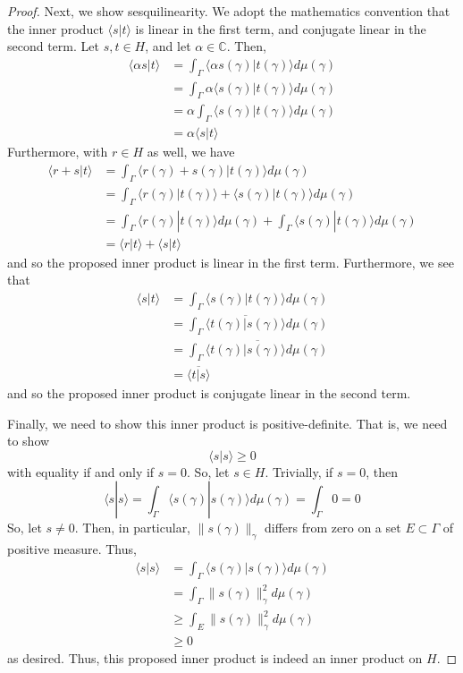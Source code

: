 \documentclass[fontsize=11pt]{scrartcl} %
\numberwithin{equation}{section} %
\numberwithin{figure}{section} %
\numberwithin{table}{section} %
\newcommand{\C}{\mathbb{C}}
\newcommand{\la}{\langle}
\newcommand{\ra}{\rangle}
\begin{document}
\begin{proof}
    Next, we show sesquilinearity. We adopt the mathematics convention that the
    inner product $\la s|t\ra$ is linear in the first term, and conjugate linear
    in the second term. Let $s,t\in H$, and let $\alpha\in \C$.
    Then,
    \[
        \begin{aligned}
        \la \alpha s|t\ra &= \int_{\Gamma}\la \alpha
        s(\gamma)|t(\gamma)\ra d\mu(\gamma)\\
        &= \int_{\Gamma}\alpha\la s(\gamma)|t(\gamma)\ra d\mu(\gamma)\\
        &= \alpha\int_{\Gamma}\la s(\gamma)|t(\gamma)\ra d\mu(\gamma)\\
        &=\alpha\la s|t\ra
    \end{aligned}
    \]
    Furthermore, with $r\in H$ as well, we have
    \[
\begin{aligned}
    \la r+s|t\ra &= \int_{\Gamma}\la r(\gamma)+s(\gamma)|t(\gamma)\ra
    d\mu(\gamma)\\
    &= \int_{\Gamma}\la r(\gamma)|t(\gamma)\ra + \la s(\gamma)|t(\gamma)\ra
    d\mu(\gamma)\\
    &=\int_{\Gamma}\la r(\gamma)|t(\gamma)\ra d\mu(\gamma) + \int_{\Gamma}\la
    s(\gamma)|t(\gamma)\ra d\mu(\gamma)\\
    &=\la r|t\ra + \la s|t\ra
\end{aligned}
    \]
    and so the proposed inner product is linear in the first term. Furthermore,
    we see that
    \[
\begin{aligned}
    \la s|t\ra &= \int_{\Gamma}\la s(\gamma)|t(\gamma)\ra d\mu(\gamma)\\
    &= \int_{\Gamma}\overline{\la t(\gamma)|s(\gamma)\ra} d\mu(\gamma)\\
    &= \overline{\int_{\Gamma}\la t(\gamma)|s(\gamma)\ra d\mu(\gamma)}\\
    &= \overline{\la t|s\ra}
\end{aligned}
    \]
    and so the proposed inner product is conjugate linear in the second term.

    Finally, we need to show this inner product is positive-definite. That is,
    we need to show
    \[
        \la s|s\ra \geq 0
    \]
    with equality if and only if $s=0$.
    So, let $s\in H$. Trivially, if $s=0$, then
    \[
        \la s|s\ra = \int_{\Gamma}\la s(\gamma)|s(\gamma)\ra d\mu(\gamma) =
        \int_{\Gamma}0 = 0
    \]
    So, let $s\neq 0$. Then, in particular, $\|s(\gamma)\|_{\gamma}$ differs
    from zero on a set $E\subset\Gamma$ of positive measure. Thus,
    \[
        \begin{aligned}
            \la s|s\ra &= \int_{\Gamma} \la s(\gamma)|s(\gamma)\ra
            d\mu(\gamma)\\
            &= \int_{\Gamma} \|s(\gamma)\|_{\gamma}^2 d\mu(\gamma)\\
            &\geq \int_E \|s(\gamma)\|_{\gamma}^2d\mu(\gamma)\\
            &\geq 0
    \end{aligned}
    \]
    as desired. Thus, this proposed inner product is indeed an inner product on
    $H$.


\end{proof}
\end{document}

